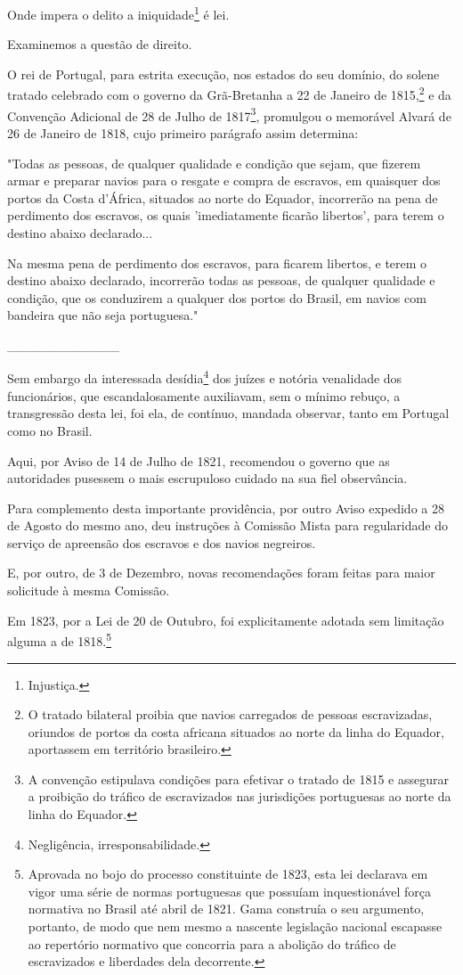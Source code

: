 Onde impera o delito a iniquidade\footnote{Injustiça.} é lei.

Examinemos a questão de direito.

O rei de Portugal, para estrita execução, nos estados do seu domínio, do
solene tratado celebrado com o governo da Grã-Bretanha a 22 de Janeiro
de 1815,\footnote{O tratado bilateral proibia que navios carregados de
  pessoas escravizadas, oriundos de portos da costa africana situados ao
  norte da linha do Equador, aportassem em território brasileiro.} e da
Convenção Adicional de 28 de Julho de 1817\footnote{A convenção
  estipulava condições para efetivar o tratado de 1815 e assegurar a
  proibição do tráfico de escravizados nas jurisdições portuguesas ao
  norte da linha do Equador.}, promulgou o memorável Alvará de 26 de
Janeiro de 1818, cujo primeiro parágrafo assim determina:

"Todas as pessoas, de qualquer qualidade e condição que sejam, que
fizerem armar e preparar navios para o resgate e compra de escravos, em
quaisquer dos portos da Costa d'África, situados ao norte do Equador,
incorrerão na pena de perdimento dos escravos, os quais 'imediatamente
ficarão libertos', para terem o destino abaixo declarado...

Na mesma pena de perdimento dos escravos, para ficarem libertos, e terem
o destino abaixo declarado, incorrerão todas as pessoas, de qualquer
qualidade e condição, que os conduzirem a qualquer dos portos do Brasil,
em navios com bandeira que não seja portuguesa."

\_\_\_\_\_\_\_\_\_\_\_\_

Sem embargo da interessada desídia\footnote{Negligência,
  irresponsabilidade.} dos juízes e notória venalidade dos funcionários,
que escandalosamente auxiliavam, sem o mínimo rebuço, a transgressão
desta lei, foi ela, de contínuo, mandada observar, tanto em Portugal
como no Brasil.

Aqui, por Aviso de 14 de Julho de 1821, recomendou o governo que as
autoridades pusessem o mais escrupuloso cuidado na sua fiel observância.

Para complemento desta importante providência, por outro Aviso expedido
a 28 de Agosto do mesmo ano, deu instruções à Comissão Mista para
regularidade do serviço de apreensão dos escravos e dos navios
negreiros.

E, por outro, de 3 de Dezembro, novas recomendações foram feitas para
maior solicitude à mesma Comissão.

Em 1823, por a Lei de 20 de Outubro, foi explicitamente adotada sem
limitação alguma a de 1818.\footnote{Aprovada no bojo do processo
  constituinte de 1823, esta lei declarava em vigor uma série de normas
  portuguesas que possuíam inquestionável força normativa no Brasil até
  abril de 1821. Gama construía o seu argumento, portanto, de modo que
  nem mesmo a nascente legislação nacional escapasse ao repertório
  normativo que concorria para a abolição do tráfico de escravizados e
  liberdades dela decorrente.}


